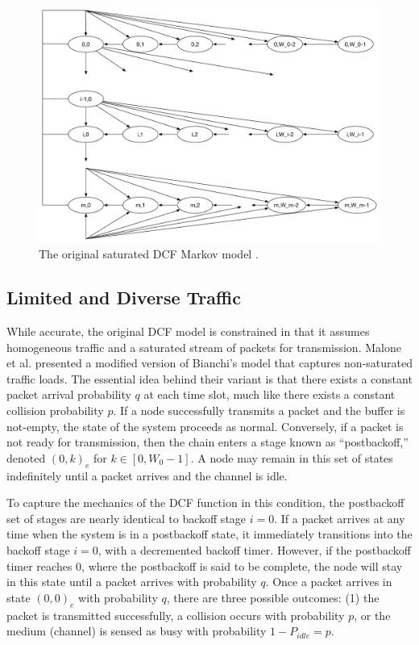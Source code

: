 \documentclass{llncs}
\begin{document}
\begin{figure}
\begin{center}
\includegraphics[scale=0.35]{../../sketches/dcf_model.pdf}
\caption{The original saturated DCF Markov model \cite{dcf}.}
\label{fig:dcf_model}
\end{center}
\end{figure}

\subsection{Limited and Diverse Traffic} \label{sec:nonsaturated}
While accurate, the original DCF model is constrained in that it assumes homogeneous traffic and a saturated stream of packets for transmission. Malone et al. \cite{dcf-nonsaturated} presented a modified version of Bianchi's model that captures non-saturated traffic loads. The essential idea behind their variant is that there exists a constant packet arrival probability $q$ at each time slot, much like there exists a constant collision probability $p$. If a node successfully transmits a packet and the buffer is not-empty, the state of the system proceeds as normal. Conversely, if a packet is not ready for transmission, then the chain enters a stage known as ``postbackoff,'' denoted $(0,k)_e$ for $k \in [0, W_0-1]$. A node may remain in this set of states indefinitely until a packet arrives and the channel is idle.

To capture the mechanics of the DCF function in this condition, the postbackoff set of stages are nearly identical to backoff stage $i = 0$. If a packet arrives at any time when the system is in a postbackoff state, it immediately transitions into the backoff stage $i = 0$, with a decremented backoff timer. However, if the postbackoff timer reaches $0$, where the postbackoff is said to be complete, the node will stay in this state until a packet arrives with probability $q$. Once a packet arrives in state $(0, 0)_e$ with probability $q$, there are three possible outcomes: (1) the packet is transmitted successfully, a collision occurs with probability $p$, or the medium (channel) is sensed as busy with probability $1 - P_{idle} = p$. 
\end{document}
